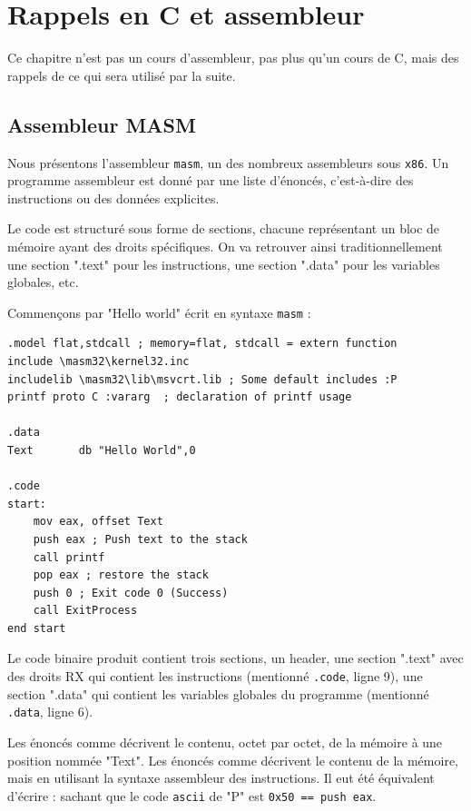 \documentclass{book}
\newcommand{\code}[1]{\texttt{#1}}
\newcommand{\xquatre}{{\tt x86}\xspace}
\begin{document}
\chapter{Rappels en C et assembleur}

Ce chapitre n'est pas un cours d'assembleur, pas plus qu'un cours de C, mais des rappels de ce qui sera utilisé par la suite. 

\section{Assembleur MASM}

Nous présentons l'assembleur {\tt masm}, un des nombreux assembleurs sous \xquatre. Un programme assembleur est donné par une liste d'énoncés, c'est-à-dire des instructions ou des données explicites. 

Le code est structuré sous forme de sections, chacune représentant un bloc de mémoire ayant des droits spécifiques. On va retrouver ainsi traditionnellement une section ".text" pour les instructions, une section ".data" pour les variables globales, etc. 

Commençons par "Hello world" écrit en syntaxe {\tt masm} :

\begin{verbatim}
.model flat,stdcall ; memory=flat, stdcall = extern function
include \masm32\kernel32.inc
includelib \masm32\lib\msvcrt.lib ; Some default includes :P
printf proto C :vararg 	; declaration of printf usage

.data
Text       db "Hello World",0

.code
start:
	mov eax, offset Text
	push eax ; Push text to the stack
	call printf 
	pop eax ; restore the stack
	push 0 ; Exit code 0 (Success)
	call ExitProcess
end start
\end{verbatim}

Le code binaire produit contient trois sections, un header, une section ".text" avec des droits RX qui contient les instructions (mentionné \code{.code}, ligne 9), une section ".data" qui contient les variables globales du programme (mentionné \code{.data}, ligne 6). 

Les énoncés comme 
 décrivent le contenu, octet par octet, de la mémoire à une position nommée "Text". 
Les énoncés comme  décrivent le contenu de la mémoire, mais en utilisant la syntaxe assembleur des instructions. Il eut été équivalent d'écrire : 
sachant que le code {\tt ascii} de "P" est \code{0x50 == push eax}. 
\end{document}

